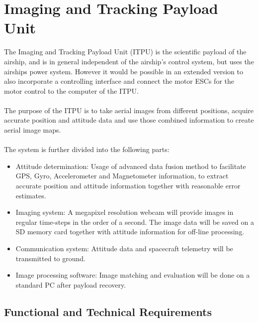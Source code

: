 \chapter{Imaging and Tracking Payload Unit}
\label{chap:itpu}

The Imaging and Tracking Payload Unit (ITPU) is the scientific payload of the
airship, and is in general independent of the airship's control system, but uses
the airships power system. However it would be possible in an extended version
to also incorporate a controlling interface and connect the motor ESCs for the
motor control to the computer of the ITPU. 
\\
\\
The purpose of the ITPU is to take aerial images from different positions, acquire
accurate position and attitude data and use those combined information to create
aerial image maps. 
\\
\\
The system is further divided into the following parts:
\begin{itemize}
\item Attitude determination: Usage of advanced data fusion method to facilitate
GPS, Gyro, Accelerometer and Magnetometer information, to extract accurate
position and attitude information together with reasonable error estimates.
\item Imaging system: A megapixel resolution webcam will provide images in
regular time-steps in the order of a second.
The image data will be saved on a SD memory card together with attitude
information for off-line processing.
\item Communication system: Attitude data and spacecraft telemetry will be
transmitted to ground.
\item Image processing software:
Image matching and evaluation will be done on a standard PC after payload
recovery.
\end{itemize}

\section{Functional and Technical Requirements}

